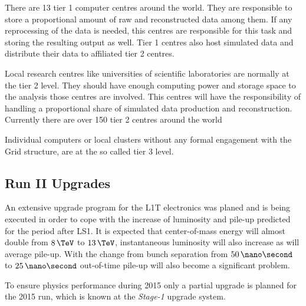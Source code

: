 There are 13 tier 1 computer centres around the world. They are responsible to store a proportional amount of raw and reconstructed data among them. If any reprocessing of the data is needed, this centres are responsible for this task and storing the resulting output as well. Tier 1 centres also host simulated data and distribute their data to affiliated tier 2 centres. 

Local research centres like universities of scientific laboratories are normally at the tier 2 level. They should have enough computing power and storage space to the analysis those centres are involved. This centres will have the responsibility of handling a proportional share of simulated data production and reconstruction. Currently there are over 150 tier 2 centres around the world

Individual computers or local clusters without any formal engagement with the Grid structure, are at the so called tier 3 level.


\subsection{Run II Upgrades}
\label{SUBSECTION:ExperimentalApparatus_CMS_RUNII}


An extensive upgrade program for the \gls{L1T} electronics was planed and is being executed in order to cope with the increase of luminosity and pile-up predicted for the period after \gls{LS1}\cite{CMSTDR:CMSL1Upgrade}. It is expected that center-of-mass energy will almost double from $8\,\TeV$ to $13\,\TeV$, instantaneous luminosity will also increase as will average pile-up. With the change from bunch separation from $50\,\nano\second$ to $25\,\nano\second$ out-of-time pile-up will also become a significant problem. 

To ensure physics performance during 2015 only a partial upgrade is planned for the 2015 run, which is known at the \textit{Stage-1} upgrade system. 

